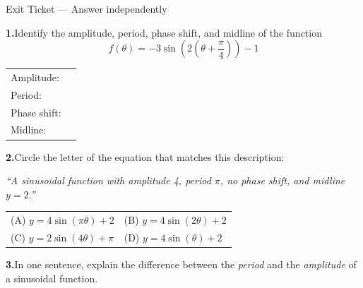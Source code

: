 \documentclass[10pt]{article}
\begin{document}
\namedateperiod

\vspace{0.12in}

\begin{notesbox}{Exit Ticket --- Answer independently}

\textbf{1.}\quad Identify the amplitude, period, phase shift, and midline of the function
$$f(\theta) = -3\sin\!\left(2\!\left(\theta + \dfrac{\pi}{4}\right)\right) - 1$$

\vspace{4pt}
\renewcommand{\arraystretch}{1.6}
\begin{tabular}{ll}
Amplitude: & \underline{\hspace{4cm}} \\[4pt]
Period: & \underline{\hspace{4cm}} \\[4pt]
Phase shift: & \underline{\hspace{4cm}} \\[4pt]
Midline: & \underline{\hspace{4cm}} \\
\end{tabular}

\vspace{0.16in}
\textbf{2.}\quad Circle the letter of the equation that matches this description:

\textit{``A sinusoidal function with amplitude 4, period $\pi$, no phase shift, and midline $y = 2$.''}

\vspace{6pt}
\begin{tabular}{ll}
(A) $y = 4\sin(\pi\theta) + 2$ \qquad\qquad & (B) $y = 4\sin(2\theta) + 2$ \\[6pt]
(C) $y = 2\sin(4\theta) + \pi$ & (D) $y = 4\sin(\theta) + 2$ \\
\end{tabular}

\vspace{0.16in}
\textbf{3.}\quad In one sentence, explain the difference between the \emph{period}
and the \emph{amplitude} of a sinusoidal function.


\end{notesbox}
\end{document}

